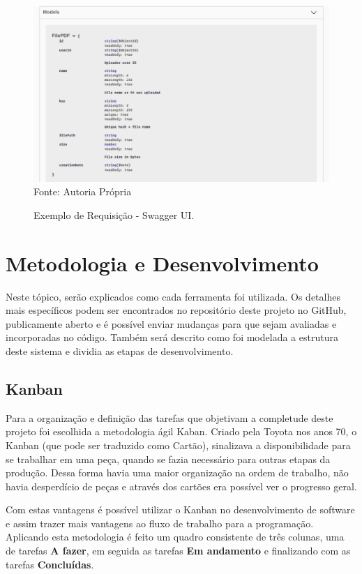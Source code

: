 \begin{figure}[H]
\centering
\captionsetup{justification   = raggedright,
              singlelinecheck = false}
\caption{Exemplo de Requisição - Swagger UI.}\label{swaggerModels}
\includegraphics[width=1\textwidth]{figs/SwaggerUIModels2.png}
\footnotesize Fonte: Autoria Própria
\end{figure}


\section{Metodologia e Desenvolvimento}

Neste tópico, serão explicados como cada ferramenta foi utilizada. Os detalhes mais específicos podem ser encontrados no repositório deste projeto no GitHub, publicamente aberto e é possível enviar mudanças para que sejam avaliadas e incorporadas no código. Também será descrito como foi modelada a estrutura deste sistema e dividia as etapas de desenvolvimento.

\subsection{Kanban}

Para a organização e definição das tarefas que objetivam a completude deste projeto foi escolhida a metodologia ágil Kaban. Criado pela Toyota nos anos 70, o Kanban (que pode ser traduzido como Cartão),  sinalizava a disponibilidade para se trabalhar em uma peça, quando se fazia necessário para outras etapas da produção. Dessa forma havia uma maior organização na ordem de trabalho, não havia desperdício de peças e através dos cartões era possível ver o progresso geral.

Com estas vantagens é possível utilizar o Kanban no desenvolvimento de software e assim trazer mais vantagens ao fluxo de trabalho para a programação. 
Aplicando esta metodologia é feito um quadro consistente de três colunas, uma de tarefas \textbf{A fazer}, em seguida as tarefas \textbf{Em andamento} e finalizando com as tarefas \textbf{Concluídas}.

